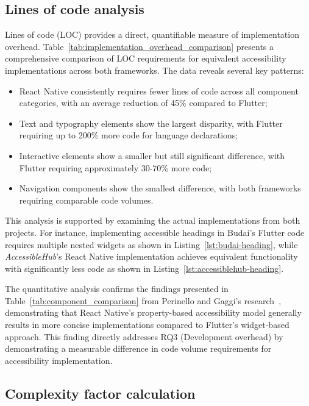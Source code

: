 \subsection{Lines of code analysis}
\label{subsec:loc-analysis}

Lines of code (LOC) provides a direct, quantifiable measure of implementation overhead. Table~\ref{tab:implementation_overhead_comparison} presents a comprehensive comparison of LOC requirements for equivalent accessibility implementations across both frameworks. The data reveals several key patterns:

\begin{itemize}
    \item React Native consistently requires fewer lines of code across all component categories, with an average reduction of 45\% compared to Flutter;
    \item Text and typography elements show the largest disparity, with Flutter requiring up to 200\% more code for language declarations;
    \item Interactive elements show a smaller but still significant difference, with Flutter requiring approximately 30-70\% more code;
    \item Navigation components show the smallest difference, with both frameworks requiring comparable code volumes.
\end{itemize}

This analysis is supported by examining the actual implementations from both projects. For instance, implementing accessible headings in Budai's Flutter code requires multiple nested widgets as shown in Listing~\ref{lst:budai-heading}, while \textit{AccessibleHub}'s React Native implementation achieves equivalent functionality with significantly less code as shown in Listing~\ref{lst:accessiblehub-heading}.

The quantitative analysis confirms the findings presented in Table~\ref{tab:component_comparison} from Perinello and Gaggi's research~\cite{perinello2024accessibility}, demonstrating that React Native's property-based accessibility model generally results in more concise implementations compared to Flutter's widget-based approach. This finding directly addresses RQ3 (Development overhead) by demonstrating a measurable difference in code volume requirements for accessibility implementation.

\subsection{Complexity factor calculation}
\label{subsec:complexity-calculation}

